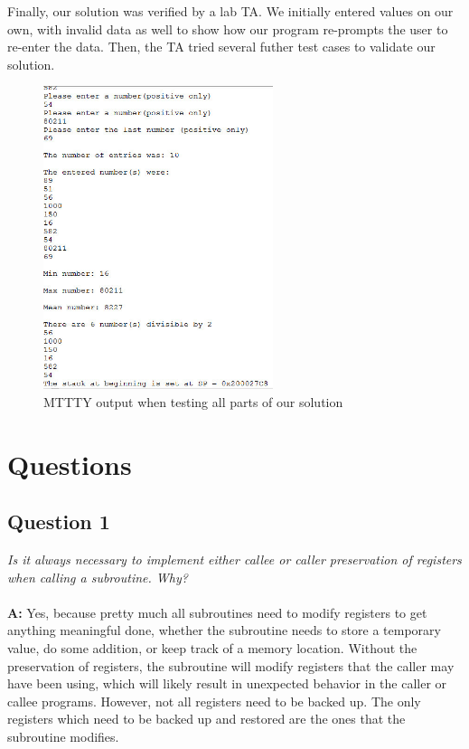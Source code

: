 \documentclass[letterpaper]{article}
\begin{document}
      Finally, our solution was verified by a lab TA. We initially entered values
      on our own, with invalid data as well to show how our
      program re-prompts the user to re-enter the data. Then, the TA tried several
      futher test cases to validate our solution.
      \begin{figure}[H]
        \centering
        \includegraphics[width=0.6\textwidth]{allparts.jpg}
        \caption{MTTTY output when testing all parts of our solution}
      \end{figure}

\section{Questions}

    \subsection{Question 1}
      \textit{Is it always necessary to implement either callee or caller preservation of registers when calling a subroutine. Why?}
      \\ \\
      \noindent\textbf{A:}
      Yes, because pretty much all subroutines need to modify registers to get anything meaningful done,
      whether the subroutine needs to store a temporary value, do some addition, or
      keep track of a memory location. Without the preservation of registers, the subroutine will
      modify registers that the caller may have been using, which will likely result
      in unexpected behavior in the caller or callee programs. However, not all registers
      need to be backed up. The only registers which need to be backed up and restored are the
      ones that the subroutine modifies.  
\end{document}
